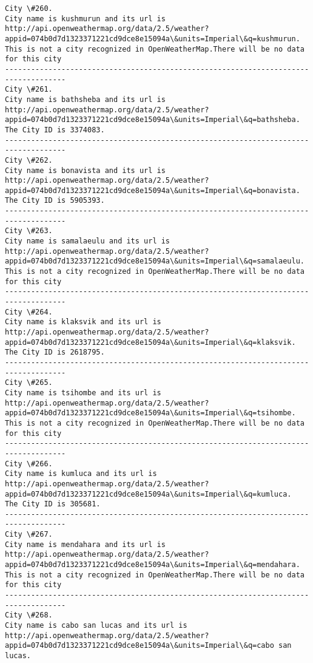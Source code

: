 \documentclass[11pt]{article}
\begin{document}
\begin{Verbatim}[commandchars=\\\{\}]
City \#260.
City name is kushmurun and its url is http://api.openweathermap.org/data/2.5/weather?appid=074b0d7d1323371221cd9dce8e15094a\&units=Imperial\&q=kushmurun.
This is not a city recognized in OpenWeatherMap.There will be no data for this city
------------------------------------------------------------------------------------
City \#261.
City name is bathsheba and its url is http://api.openweathermap.org/data/2.5/weather?appid=074b0d7d1323371221cd9dce8e15094a\&units=Imperial\&q=bathsheba.
The City ID is 3374083.
------------------------------------------------------------------------------------
City \#262.
City name is bonavista and its url is http://api.openweathermap.org/data/2.5/weather?appid=074b0d7d1323371221cd9dce8e15094a\&units=Imperial\&q=bonavista.
The City ID is 5905393.
------------------------------------------------------------------------------------
City \#263.
City name is samalaeulu and its url is http://api.openweathermap.org/data/2.5/weather?appid=074b0d7d1323371221cd9dce8e15094a\&units=Imperial\&q=samalaeulu.
This is not a city recognized in OpenWeatherMap.There will be no data for this city
------------------------------------------------------------------------------------
City \#264.
City name is klaksvik and its url is http://api.openweathermap.org/data/2.5/weather?appid=074b0d7d1323371221cd9dce8e15094a\&units=Imperial\&q=klaksvik.
The City ID is 2618795.
------------------------------------------------------------------------------------
City \#265.
City name is tsihombe and its url is http://api.openweathermap.org/data/2.5/weather?appid=074b0d7d1323371221cd9dce8e15094a\&units=Imperial\&q=tsihombe.
This is not a city recognized in OpenWeatherMap.There will be no data for this city
------------------------------------------------------------------------------------
City \#266.
City name is kumluca and its url is http://api.openweathermap.org/data/2.5/weather?appid=074b0d7d1323371221cd9dce8e15094a\&units=Imperial\&q=kumluca.
The City ID is 305681.
------------------------------------------------------------------------------------
City \#267.
City name is mendahara and its url is http://api.openweathermap.org/data/2.5/weather?appid=074b0d7d1323371221cd9dce8e15094a\&units=Imperial\&q=mendahara.
This is not a city recognized in OpenWeatherMap.There will be no data for this city
------------------------------------------------------------------------------------
City \#268.
City name is cabo san lucas and its url is http://api.openweathermap.org/data/2.5/weather?appid=074b0d7d1323371221cd9dce8e15094a\&units=Imperial\&q=cabo san lucas.

\end{Verbatim}
\end{document}
